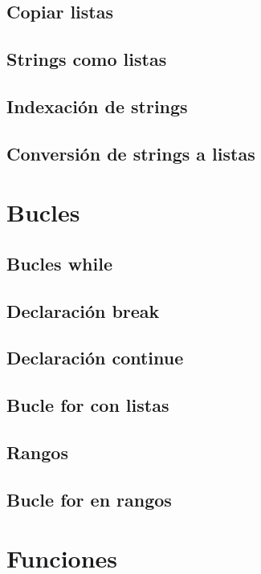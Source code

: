 \documentclass{article}
\begin{document}
\subsection{Copiar listas}

\subsection{Strings como listas}

\subsection{Indexación de strings}

\subsection{Conversión de strings a listas}

\section{Bucles}

\subsection{Bucles while}

\subsection{Declaración break}

\subsection{Declaración continue}

\subsection{Bucle for con listas}

\subsection{Rangos}

\subsection{Bucle for en rangos}

\section{Funciones}
\end{document}
